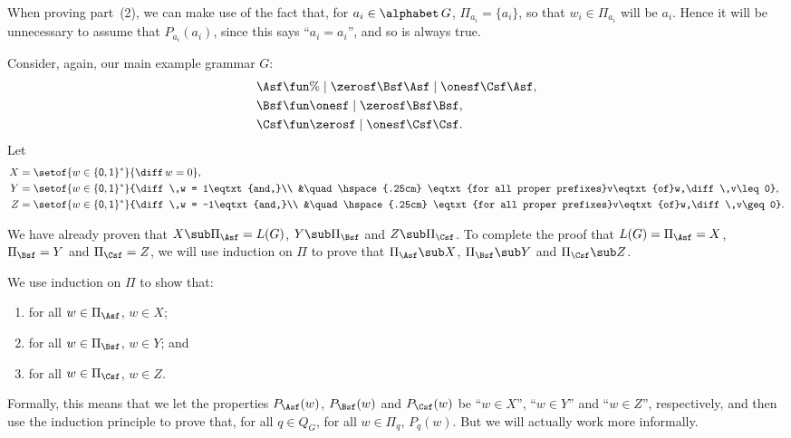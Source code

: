 When proving part~(2), we can make use of the fact that, for
$a_i\in\alphabet\,G$, $\Pi_{a_i} = \{a_i\}$, so that $w_i\in\Pi_{a_i}$
will be $a_i$.  Hence it will be unnecessary to assume that
$P_{a_i}(a_i)$, since this says ``$a_i=a_i$'', and so is always true.

Consider, again, our main example grammar $G$:
\begin{align*}
\Asf &\fun \% \mid \zerosf\Bsf\Asf \mid \onesf\Csf\Asf , \\
\Bsf &\fun \onesf \mid \zerosf\Bsf\Bsf , \\
\Csf &\fun \zerosf \mid \onesf\Csf\Csf .
\end{align*}
Let
\begin{align*}
X &= \setof{w\in\{\mathsf{0,1}\}^*}{\diff\,w = 0} , \\
Y &= \setof{w\in\{\mathsf{0,1}\}^*}{\diff\,w = 1\eqtxt{and,}\\
&\quad\hspace{.25cm}
\eqtxt{for all proper prefixes}v\eqtxt{of}w,\diff\,v\leq 0} , \\
Z &= \setof{w\in\{\mathsf{0,1}\}^*}{\diff\,w = -1\eqtxt{and,}\\
&\quad\hspace{.25cm}
\eqtxt{for all proper prefixes}v\eqtxt{of}w,\diff\,v\geq 0} .
\end{align*}

We have already proven that $X\sub\Pi_\Asf=L(G)$, $Y\sub\Pi_\Bsf$ and
$Z\sub\Pi_\Csf$.  To complete the proof that
$L(G)=\Pi_\Asf=X$, $\Pi_\Bsf=Y$ and $\Pi_\Csf=Z$, we will use
induction on $\Pi$ to prove that
$\Pi_\Asf\sub X$, $\Pi_\Bsf\sub Y$ and $\Pi_\Csf\sub Z$.

We use induction on $\Pi$ to show that:
\begin{enumerate}[\quad(A)]
\item for all $w\in\Pi_\Asf$, $w\in X$;

\item for all $w\in\Pi_\Bsf$, $w\in Y$; and

\item for all $w\in\Pi_\Csf$, $w\in Z$.
\end{enumerate}
Formally, this means that we let the properties $P_\Asf(w)$,
$P_\Bsf(w)$ and $P_\Csf(w)$ be ``$w\in X$'', ``$w\in Y$'' and ``$w\in
Z$'', respectively, and then use the induction principle to prove
that, for all $q\in Q_G$, for all $w\in\Pi_q$,
$P_q(w)$.  But we will actually work more informally.

